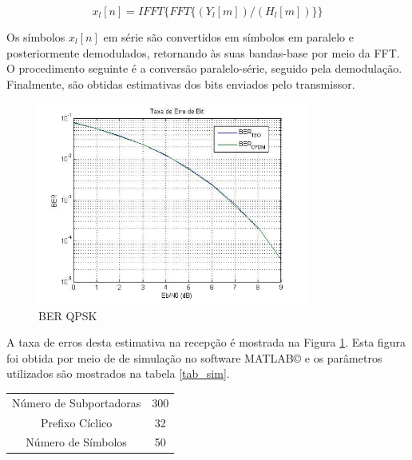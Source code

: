 \begin{equation}\label{equalizationOFDM}
x_{l}[n]=IFFT\{FFT\{(Y_{l}[m])/(H_{l}[m])\}\}
\end{equation}

\par Os símbolos $x_{l}[n]$ em série são convertidos em símbolos em paralelo e posteriormente demodulados, retornando às suas bandas-base por meio da FFT. O procedimento seguinte é a conversão paralelo-série, seguido pela demodulação. Finalmente, são obtidas estimativas dos bits enviados pelo transmissor. 

\begin{figure}[h!]
\centering
\includegraphics[width=3.5in]{BER_TEO.png} 
\caption{BER QPSK}
\label{taxa_erros}
\end{figure}

\par A taxa de erros desta estimativa na recepção é mostrada na Figura \ref{taxa_erros}. Esta figura foi obtida por meio de de simulação no software MATLAB© e os parâmetros utilizados são mostrados na tabela \ref{tab_sim}. 

\begin{center} \label{tab_sim}
\begin{tabular}{ c c}
Número de Subportadoras & 300  \\ 
Prefixo Cíclico & 32 \\  
Número de Símbolos & 50 \\
\end{tabular}
\end{center}

